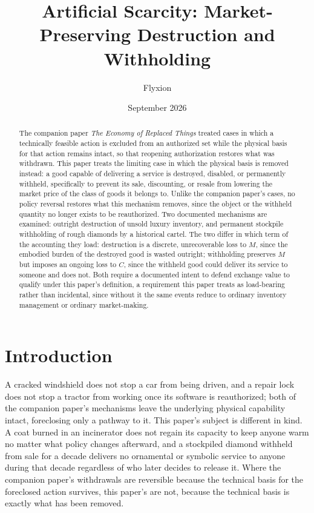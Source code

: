 \documentclass[11pt]{article}
\title{Artificial Scarcity: Market-Preserving Destruction and Withholding}
\author{Flyxion}
\affil{Independent Researcher}
\date{September 2026}
\begin{document}
\maketitle

\begin{abstract}
The companion paper \emph{The Economy of Replaced Things} treated cases in which a technically feasible action is excluded from an authorized set while the physical basis for that action remains intact, so that reopening authorization restores what was withdrawn. This paper treats the limiting case in which the physical basis is removed instead: a good capable of delivering a service is destroyed, disabled, or permanently withheld, specifically to prevent its sale, discounting, or resale from lowering the market price of the class of goods it belongs to. Unlike the companion paper's cases, no policy reversal restores what this mechanism removes, since the object or the withheld quantity no longer exists to be reauthorized. Two documented mechanisms are examined: outright destruction of unsold luxury inventory, and permanent stockpile withholding of rough diamonds by a historical cartel. The two differ in which term of the accounting they load: destruction is a discrete, unrecoverable loss to $M$, since the embodied burden of the destroyed good is wasted outright; withholding preserves $M$ but imposes an ongoing loss to $C$, since the withheld good could deliver its service to someone and does not. Both require a documented intent to defend exchange value to qualify under this paper's definition, a requirement this paper treats as load-bearing rather than incidental, since without it the same events reduce to ordinary inventory management or ordinary market-making.
\end{abstract}

\section{Introduction}

A cracked windshield does not stop a car from being driven, and a repair lock does not stop a tractor from working once its software is reauthorized; both of the companion paper's mechanisms leave the underlying physical capability intact, foreclosing only a pathway to it. This paper's subject is different in kind. A coat burned in an incinerator does not regain its capacity to keep anyone warm no matter what policy changes afterward, and a stockpiled diamond withheld from sale for a decade delivers no ornamental or symbolic service to anyone during that decade regardless of who later decides to release it. Where the companion paper's withdrawals are reversible because the technical basis for the foreclosed action survives, this paper's are not, because the technical basis is exactly what has been removed.
\end{document}

